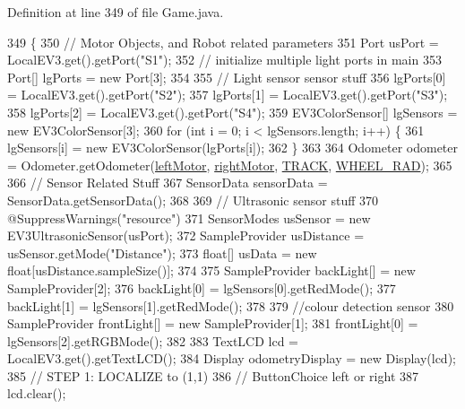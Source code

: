 Definition at line 349 of file Game.\+java.


\begin{DoxyCode}
349                                                       \{
350     \textcolor{comment}{// Motor Objects, and Robot related parameters}
351     Port usPort = LocalEV3.get().getPort(\textcolor{stringliteral}{"S1"});
352     \textcolor{comment}{// initialize multiple light ports in main}
353     Port[] lgPorts = \textcolor{keyword}{new} Port[3];
354 
355     \textcolor{comment}{// Light sensor sensor stuff}
356     lgPorts[0] = LocalEV3.get().getPort(\textcolor{stringliteral}{"S2"});
357     lgPorts[1] = LocalEV3.get().getPort(\textcolor{stringliteral}{"S3"});
358     lgPorts[2] = LocalEV3.get().getPort(\textcolor{stringliteral}{"S4"});
359     EV3ColorSensor[] lgSensors = \textcolor{keyword}{new} EV3ColorSensor[3];
360     \textcolor{keywordflow}{for} (\textcolor{keywordtype}{int} i = 0; i < lgSensors.length; i++) \{
361       lgSensors[i] = \textcolor{keyword}{new} EV3ColorSensor(lgPorts[i]);
362     \}
363 
364     Odometer odometer = Odometer.getOdometer(\hyperlink{enumca_1_1mcgill_1_1ecse211_1_1project_1_1_game_a7c673571bf50fdb6917a9d7bb671e003}{leftMotor}, \hyperlink{enumca_1_1mcgill_1_1ecse211_1_1project_1_1_game_a7a05fcf37c4435c32270776a427ba0d2}{rightMotor}, 
      \hyperlink{enumca_1_1mcgill_1_1ecse211_1_1project_1_1_game_a64cf12cdd6772ac1ce351ff1dfadd626}{TRACK}, \hyperlink{enumca_1_1mcgill_1_1ecse211_1_1project_1_1_game_a91bd64670c2a91d006c907142783b1f8}{WHEEL\_RAD});
365 
366     \textcolor{comment}{// Sensor Related Stuff}
367     SensorData sensorData = SensorData.getSensorData();
368 
369     \textcolor{comment}{// Ultrasonic sensor stuff}
370     @SuppressWarnings(\textcolor{stringliteral}{"resource"})
371     SensorModes usSensor = new EV3UltrasonicSensor(usPort);
372     SampleProvider usDistance = usSensor.getMode("Distance");
373     \textcolor{keywordtype}{float}[] usData = new \textcolor{keywordtype}{float}[usDistance.sampleSize()];
374 
375     SampleProvider backLight[] = new SampleProvider[2];
376     backLight[0] = lgSensors[0].getRedMode();
377     backLight[1] = lgSensors[1].getRedMode();
378     
379     \textcolor{comment}{//colour detection sensor}
380     SampleProvider frontLight[] = new SampleProvider[1];
381     frontLight[0] = lgSensors[2].getRGBMode();
382 
383     TextLCD lcd = LocalEV3.get().getTextLCD();
384     Display odometryDisplay = new Display(lcd);
385     \textcolor{comment}{// STEP 1: LOCALIZE to (1,1)}
386     \textcolor{comment}{// ButtonChoice left or right}
387     lcd.clear();

\end{DoxyCode}
